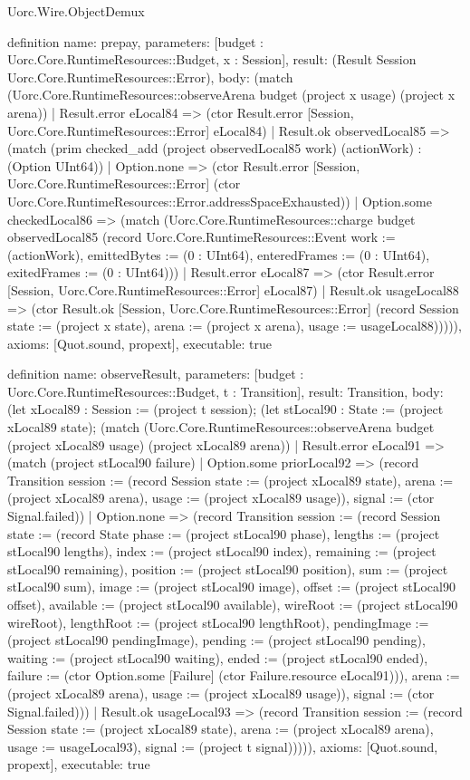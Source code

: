 \begin{lexlean}{Uorc.Wire.ObjectDemux}
\begin{semanticmodule}
definition{
  name: prepay,
  parameters: [budget : Uorc.Core.RuntimeResources::Budget, x : Session],
  result: (Result Session Uorc.Core.RuntimeResources::Error),
  body: (match (Uorc.Core.RuntimeResources::observeArena budget (project x usage) (project x arena))
    | Result.error eLocal84 => (ctor Result.error [Session, Uorc.Core.RuntimeResources::Error] eLocal84)
    | Result.ok observedLocal85 => (match (prim checked_add (project observedLocal85 work) (actionWork) : (Option UInt64))
      | Option.none => (ctor Result.error [Session, Uorc.Core.RuntimeResources::Error] (ctor Uorc.Core.RuntimeResources::Error.addressSpaceExhausted))
      | Option.some checkedLocal86 => (match (Uorc.Core.RuntimeResources::charge budget observedLocal85 (record Uorc.Core.RuntimeResources::Event {work := (actionWork), emittedBytes := (0 : UInt64), enteredFrames := (0 : UInt64), exitedFrames := (0 : UInt64)}))
        | Result.error eLocal87 => (ctor Result.error [Session, Uorc.Core.RuntimeResources::Error] eLocal87)
        | Result.ok usageLocal88 => (ctor Result.ok [Session, Uorc.Core.RuntimeResources::Error] (record Session {state := (project x state), arena := (project x arena), usage := usageLocal88}))))),
  axioms: [Quot.sound, propext],
  executable: true
}

definition{
  name: observeResult,
  parameters: [budget : Uorc.Core.RuntimeResources::Budget, t : Transition],
  result: Transition,
  body: (let xLocal89 : Session := (project t session); (let stLocal90 : State := (project xLocal89 state); (match (Uorc.Core.RuntimeResources::observeArena budget (project xLocal89 usage) (project xLocal89 arena))
    | Result.error eLocal91 => (match (project stLocal90 failure)
      | Option.some priorLocal92 => (record Transition {session := (record Session {state := (project xLocal89 state), arena := (project xLocal89 arena), usage := (project xLocal89 usage)}), signal := (ctor Signal.failed)})
      | Option.none => (record Transition {session := (record Session {state := (record State {phase := (project stLocal90 phase), lengths := (project stLocal90 lengths), index := (project stLocal90 index), remaining := (project stLocal90 remaining), position := (project stLocal90 position), sum := (project stLocal90 sum), image := (project stLocal90 image), offset := (project stLocal90 offset), available := (project stLocal90 available), wireRoot := (project stLocal90 wireRoot), lengthRoot := (project stLocal90 lengthRoot), pendingImage := (project stLocal90 pendingImage), pending := (project stLocal90 pending), waiting := (project stLocal90 waiting), ended := (project stLocal90 ended), failure := (ctor Option.some [Failure] (ctor Failure.resource eLocal91))}), arena := (project xLocal89 arena), usage := (project xLocal89 usage)}), signal := (ctor Signal.failed)}))
    | Result.ok usageLocal93 => (record Transition {session := (record Session {state := (project xLocal89 state), arena := (project xLocal89 arena), usage := usageLocal93}), signal := (project t signal)})))),
  axioms: [Quot.sound, propext],
  executable: true
}


\end{semanticmodule}
\end{lexlean}
